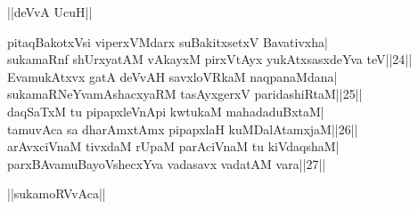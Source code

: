 \documentclass{article}
\begin{document}
\begin{center}
||deVvA UcuH||
\end{center}

pitaqBakotxVsi viperxVMdarx suBakitxsetxV Bavativxha|\\
sukamaRnf shUrxyatAM vAkayxM pirxVtAyx yukAtxsasxdeYva teV||24||\\
EvamukAtxvx gatA deVvAH savxloVRkaM naqpanaMdana|\\
sukamaRNeYvamAshacxyaRM tasAyxgerxV paridashiRtaM||25||\\
daqSaTxM tu pipapxleVnApi kwtukaM mahadaduBxtaM|\\
tamuvAca sa dharAmxtAmx pipapxlaH kuMDalAtamxjaM||26||\\
arAvxciVnaM tivxdaM rUpaM parAciVnaM tu kiVdaqshaM|\\
parxBAvamuBayoVshecxYva vadasavx vadatAM vara||27||\\

\begin{center}
||sukamoRVvAca||
\end{center} 
 
\end{document}

